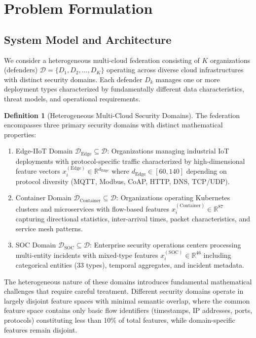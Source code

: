 \documentclass[12pt,a4paper]{article}
\theoremstyle{definition}
\newtheorem{definition}[theorem]{Definition}
\newcommand{\R}{\mathbb{R}}
\newcommand{\D}{\mathcal{D}}
\begin{document}
\section{Problem Formulation}

\subsection{System Model and Architecture}

We consider a heterogeneous multi-cloud federation consisting of $K$ organizations (defenders) $\D = \{D_1, D_2, \ldots, D_K\}$ operating across diverse cloud infrastructures with distinct security domains. Each defender $D_k$ manages one or more deployment types characterized by fundamentally different data characteristics, threat models, and operational requirements.

\begin{definition}[Heterogeneous Multi-Cloud Security Domains]
\label{def:security_domains}
The federation encompasses three primary security domains with distinct mathematical properties:
\begin{enumerate}
\item Edge-IIoT Domain $\D_{\text{Edge}} \subseteq \D$: Organizations managing industrial IoT deployments with protocol-specific traffic characterized by high-dimensional feature vectors $x_i^{(\text{Edge})} \in \R^{d_{\text{Edge}}}$ where $d_{\text{Edge}} \in [60, 140]$ depending on protocol diversity (MQTT, Modbus, CoAP, HTTP, DNS, TCP/UDP).

\item Container Domain $\D_{\text{Container}} \subseteq \D$: Organizations operating Kubernetes clusters and microservices with flow-based features $x_i^{(\text{Container})} \in \R^{87}$ capturing directional statistics, inter-arrival times, packet characteristics, and service mesh patterns.

\item SOC Domain $\D_{\text{SOC}} \subseteq \D$: Enterprise security operations centers processing multi-entity incidents with mixed-type features $x_i^{(\text{SOC})} \in \R^{46}$ including categorical entities (33 types), temporal aggregates, and incident metadata.
\end{enumerate}
\end{definition}

The heterogeneous nature of these domains introduces fundamental mathematical challenges that require careful treatment. Different security domains operate in largely disjoint feature spaces with minimal semantic overlap, where the common feature space contains only basic flow identifiers (timestamps, IP addresses, ports, protocols) constituting less than 10\% of total features, while domain-specific features remain disjoint.
\end{document}
